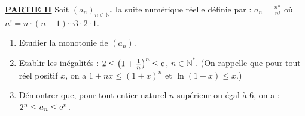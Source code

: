       \underline{\textbf{PARTIE II}}
            Soit $(a_n)_{n\in\mathbb{N}^*}$ la suite num\'erique r\'eelle d\'efinie par : 
            $a_n = \frac{n^n}{n!}$ o\`u $n! = n \cdot (n-1) \cdots 3 \cdot 2 \cdot 1$.
            \begin{enumerate}
                  \item Etudier la monotonie de $(a_n)$.
                  \item Etablir les in\'egalit\'es : $2 \leq \left( 1 +\frac{1}{n} \right)^n \leq \mathrm{e}^{}$, $n\in\mathbb{N}^*$.
                        (On rappelle que pour tout r\'eel positif $x$, on a 
                        $1+nx \leq (1+x)^n$ et $\ln (1+x) \leq x$.)
                  \item D\'emontrer que, pour tout entier naturel $n$ sup\'erieur ou \'egal \`a 6, on a : 
                        $2^n \leq a_n \leq \mathrm{e}^{n}$.
            \end{enumerate}





































